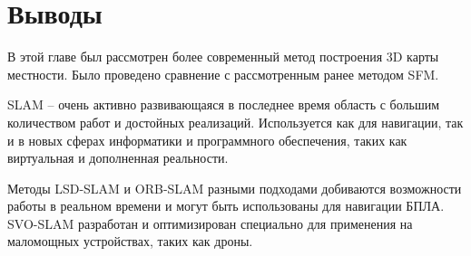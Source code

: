 \section{Выводы}

В этой главе был рассмотрен более современный метод построения 3D карты местности. Было проведено сравнение с рассмотренным ранее методом SFM.

SLAM -- очень активно развивающаяся в последнее время область с большим количеством работ и достойных реализаций. Используется как для навигации, так и в новых сферах информатики и программного обеспечения, таких как виртуальная и дополненная реальности.

Методы LSD-SLAM и ORB-SLAM разными подходами добиваются возможности работы в реальном времени и могут быть использованы для навигации БПЛА. SVO-SLAM разработан и оптимизирован специально для применения на маломощных устройствах, таких как дроны.
